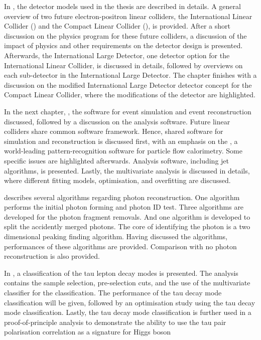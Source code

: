 In , the detector models used in the thesis are described in details. A general overview of two future electron-positron linear colliders, the International Linear Collider (\ILC) and the Compact Linear Collider (\CLIC), is provided. After a short discussion on the physics program for these future colliders, a discussion of the impact of physics and other requirements on the detector design is presented. Afterwards, the International Large Detector, one detector option for the International Linear Collider, is discussed in details, followed by overviews on each sub-detector in the International Large Detector. The chapter finishes with a discussion on the modified International Large Detector detector concept for the Compact Linear Collider, where the modifications of the detector are highlighted.

In the next chapter, , the software for event simulation and event reconstruction  discussed, followed by a discussion on the analysis software. Future linear colliders share common software framework. Hence, shared software for simulation and reconstruction is discussed first, with an emphasis on the \pandora, a world-leading pattern-recognition software for particle flow calorimetry. Some \CLIC specific issues are highlighted afterwards. Analysis software, including jet algorithms, is presented. Lastly, the multivariate analysis is discussed in details, where different fitting models, optimisation, and overfitting are discussed.


 describes several \pandora algorithms regarding photon reconstruction. One algorithm performs the initial photon forming and photon ID test. Three algorithms are developed for the photon fragment removals. And one algorithm is developed to split the accidently merged photons. The core of identifying the photon is a two dimensional peaking finding algorithm. Having discussed the algorithms, performances of these algorithms are provided. Comparison with no photon reconstruction is also provided.

In , a classification of the tau lepton decay modes is presented. The analysis contains the sample selection, pre-selection cuts, and the use of the multivariate classifier for the classification.  The performance of the tau decay mode classification will be given, followed by an \ECAL optimisation study using the tau decay mode classification. Lastly, the  tau decay mode classification is further used in a proof-of-principle analysis to demonstrate the ability to use the tau pair polarisation correlation as a signature for Higgs boson



